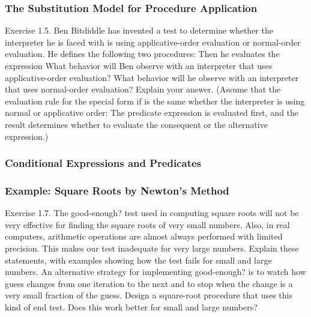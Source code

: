             \subsubsection{The Substitution Model for Procedure Application}
Exercise 1.5. Ben Bitdiddle has invented a test to determine whether the interpreter he is faced with is using applicative-order evaluation or normal-order evaluation. He defines the following two procedures:
\newline
{}
\newline
{}
\newline
{}
\newline
{}
\newline
{}
\newline
Then he evaluates the expression
\newline
{}
\newline
What behavior will Ben observe with an interpreter that uses applicative-order evaluation? What behavior will he observe with an interpreter that uses normal-order evaluation? Explain your answer.  (Assume that the evaluation rule for the special form if is the same whether the interpreter is using normal or applicative order: The predicate expression is evaluated first, and the result determines whether to evaluate the consequent or the alternative expression.)
\newline

            \subsubsection{Conditional Expressions and Predicates}
            \subsubsection{Example: Square Roots by Newton's Method}
Exercise 1.7. The good-enough? test used in computing square roots will not be very effective for finding the square roots of very small numbers. Also, in real computers, arithmetic operations are almost always performed with limited precision. This makes our test inadequate for very large numbers. Explain these statements, with examples showing how the test fails for small and large numbers. An alternative strategy for implementing good-enough? is to watch how guess changes from one iteration to the next and to stop when the change is a very small fraction of the guess. Design a square-root procedure that uses this kind of end test. Does this work better for small and large numbers?
\newline

